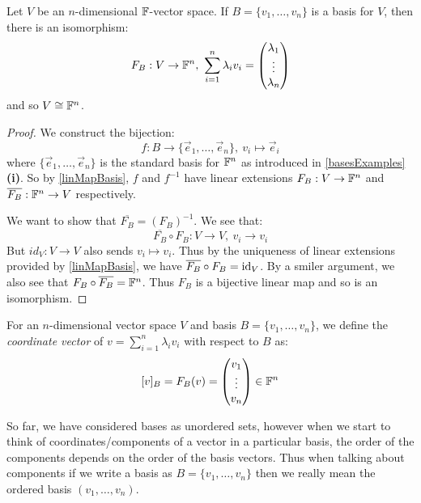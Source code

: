 \documentclass[../main.tex]{subfiles}
\begin{document}
\begin{corollary}
  Let $V$ be an $n$-dimensional $\mathbb{F}$-vector space.
  If $B = \{v_1, \ldots, v_n\}$ is a basis for $V$, then there is an isomorphism:
  \[
    F_B: V \to \mathbb{F}^n,\ \sum_{i = 1}^{n} \lambda_i v_i = \begin{pmatrix}
    \lambda_1 \\
    \vdots \\
    \lambda_n \\
    \end{pmatrix}
  \]
  and so $V \cong \mathbb{F}^n$. \label{FIso}
\end{corollary}
\begin{proof}
  We construct the bijection:
  \[
    f: B \to \{\vec{e}_1, \ldots, \vec{e}_n\},\ v_i \mapsto \vec{e}_i
  \]
  where $\{\vec{e}_1, \ldots, \vec{e}_n\}$ is the standard basis for $\mathbb{F}^n$ as introduced in \cref{basesExamples} \textbf{(i)}.
  So by \cref{linMapBasis}, $f$ and $f^{-1}$ have linear extensions $F_B: V \to \mathbb{F}^n$ and $\overline{F_B}: \mathbb{F}^n \to V$ respectively.

  We want to show that $\overline{F_B} = (F_B)^{-1}$.
  We see that:
  \[
    \overline{F_B} \circ F_B: V \to V,\ v_i \to v_i
  \]
  But $id_V: V \to V$ also sends $v_i \mapsto v_i$.
  Thus by the uniqueness of linear extensions provided by \cref{linMapBasis}, we have $\overline{F_B} \circ F_B = \mathrm{id}_V$.
  By a smiler argument, we also see that $F_B \circ \overline{F_B} = \mathbb{F}^n$.
  Thus $F_B$ is a bijective linear map and so is an isomorphism.
\end{proof}
\begin{definition}
  For an $n$-dimensional vector space $V$ and basis $B = \{v_1, \ldots, v_n\}$, we define the \textit{coordinate vector} of $v = \sum_{i = 1}^{n} \lambda_i v_i$ with respect to $B$ as: \label{coordVector}
  \[
    [v]_{B} = F_B(v) = \begin{pmatrix}
    v_1 \\
    \vdots \\
    v_n \\
    \end{pmatrix} \in \mathbb{F}^n
  \]
\end{definition}
\begin{remark} \label{basisOrder}
  So far, we have considered bases as unordered sets, however when we start to think of coordinates/components of a vector in a particular basis, the order of the components depends on the order of the basis vectors.
  Thus when talking about components if we write a basis as $B = \{v_1, \ldots, v_n\}$ then we really mean the ordered basis $(v_1, \ldots, v_n)$.
\end{remark}
\end{document}
